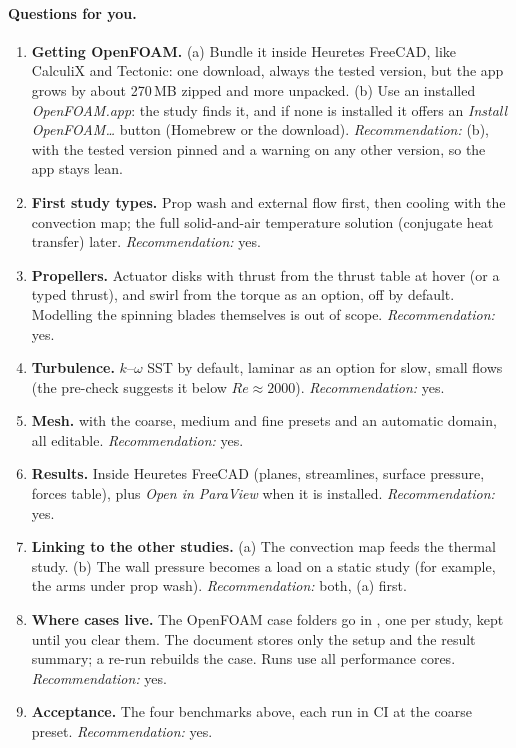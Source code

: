 \paragraph{Questions for you.}
\begin{enumerate}[label=O\arabic*.]
  \item \textbf{Getting OpenFOAM.} (a) Bundle it inside Heuretes FreeCAD, like CalculiX and Tectonic: one download,
        always the tested version, but the app grows by about 270\,MB zipped and more unpacked. (b) Use an
        installed \emph{OpenFOAM.app}: the study finds it, and if none is installed it offers an
        \emph{Install OpenFOAM\ldots} button (Homebrew or the download). \emph{Recommendation:} (b), with the
        tested version pinned and a warning on any other version, so the app stays lean.
  \item \textbf{First study types.} Prop wash and external flow first, then cooling with the convection map;
        the full solid-and-air temperature solution (conjugate heat transfer) later.
        \emph{Recommendation:} yes.
  \item \textbf{Propellers.} Actuator disks with thrust from the  thrust table at hover (or a
        typed thrust), and swirl from the torque as an option, off by default. Modelling the spinning blades
        themselves is out of scope. \emph{Recommendation:} yes.
  \item \textbf{Turbulence.} $k$--$\omega$ SST by default, laminar as an option for slow, small flows (the pre-check
        suggests it below $Re\approx2000$). \emph{Recommendation:} yes.
  \item \textbf{Mesh.}  with the coarse, medium and fine presets and an automatic domain,
        all editable. \emph{Recommendation:} yes.
  \item \textbf{Results.} Inside Heuretes FreeCAD (planes, streamlines, surface pressure, forces table), plus
        \emph{Open in ParaView} when it is installed. \emph{Recommendation:} yes.
  \item \textbf{Linking to the other studies.} (a) The convection map feeds the thermal study. (b) The wall
        pressure becomes a load on a static study (for example, the arms under prop wash).
        \emph{Recommendation:} both, (a) first.
  \item \textbf{Where cases live.} The OpenFOAM case folders go in , one per study, kept until you clear them. The document stores only the setup and the
        result summary; a re-run rebuilds the case. Runs use all performance cores.
        \emph{Recommendation:} yes.
  \item \textbf{Acceptance.} The four benchmarks above, each run in CI at the coarse preset.
        \emph{Recommendation:} yes.
\end{enumerate}

